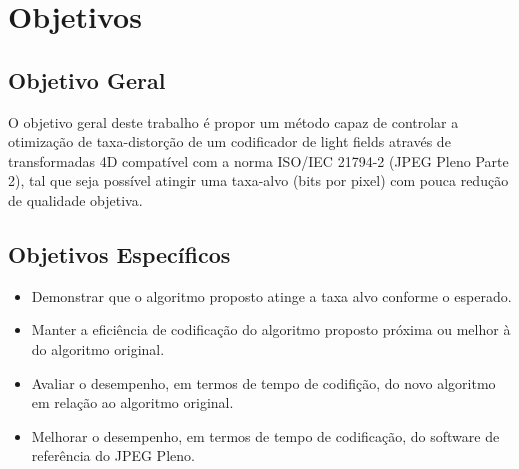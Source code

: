 \section{Objetivos}
    \subsection{Objetivo Geral}
        O objetivo geral deste trabalho é propor um método capaz de controlar a otimização de taxa-distorção de um codificador de light fields através 
        de transformadas 4D compatível com a norma ISO/IEC 21794-2 (JPEG Pleno Parte 2), tal que seja possível atingir uma taxa-alvo (bits por pixel) 
        com pouca redução de qualidade objetiva.

    \subsection{Objetivos Específicos}
        \begin{itemize}
            \item Demonstrar que o algoritmo proposto atinge a taxa alvo conforme o esperado.
            \item Manter a eficiência de codificação do algoritmo proposto próxima ou melhor à do algoritmo original.
            \item Avaliar o desempenho, em termos de tempo de codifição, do novo algoritmo em relação ao algoritmo original.
            \item Melhorar o desempenho, em termos de tempo de codificação, do software de referência do JPEG Pleno.
        \end{itemize}
